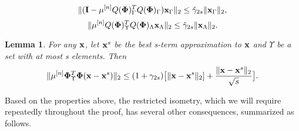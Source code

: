 \documentclass[article]{imsart}
\newtheorem{lemma}{Lemma}
\begin{document}
\begin{equation}\label{1-q_mu*phi*phi}
    \| ( {\bf I}- \mu^{[n]}Q({\bf {\bf \Phi}})_{\Gamma}^TQ({\bf {\bf \Phi}})_{\Gamma}){\bf x}_{\Gamma}\|_2 \leq \hat{\gamma}_{2s}\|{\bf x}_{\Gamma} \|_2,
\end{equation}
\begin{equation}\label{q_mu*phi1*phi2}
    \| \mu^{[n]}Q({\bf {\bf \Phi}})_{\Upsilon}^TQ({\bf {\bf \Phi}})_{\Lambda}{\bf x}_{\Lambda}\|_2 \leq \hat{\gamma}_{2s}\|{\bf x}_{\Lambda} \|_2.
\end{equation}
\begin{lemma} \label{residual_lemma}
{\rm{\cite{blumensath2010niht}}}
For any ${\bf x}$, let ${\bf x}^s$ be the best s-term approximation to ${\bf x}$ and $\Upsilon$ be a set with at most s elements. Then
\begin{equation}\label{residual_x_bound}
\|\mu^{[n]}{\bf \Phi}^T_{\Upsilon} {\bf \Phi} ({\bf x}-{\bf x}^s)\|_2 \leq (1+\gamma_{2s})\big [\|{\bf x}-{\bf x}^s\|_2 ]+ \frac{\|{\bf x}-{\bf x}^s\|_2}{\sqrt{s}}\big].
\end{equation}
\end{lemma}
Based on the properties above, the restricted isometry, which we will require repeatedly throughout the proof, has several other consequences, summarized as follows.
\end{document}
